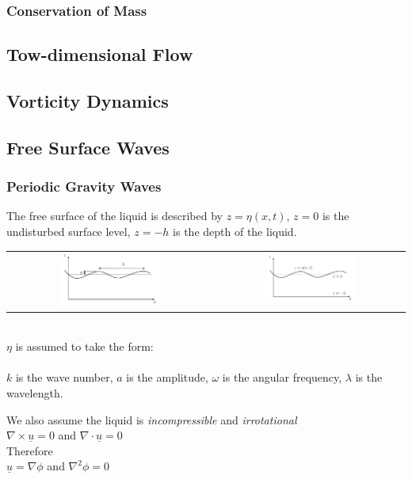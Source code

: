 \subsubsection{Conservation of Mass}
\subsection{Tow-dimensional Flow}
\subsection{Vorticity Dynamics}
\subsection{Free Surface Waves}
\subsubsection{Periodic Gravity Waves}
\begin{center}
	The free surface of the liquid is described by $z = \eta (x,t)$, $z=0$ is the undisturbed surface level, $z=-h$ is the depth of the liquid.
	\\
	\begin{tabular}{cc}
		\includegraphics[width=0.5\textwidth]{"Images/Gravity Waves2.png"} & \includegraphics[width=0.5\textwidth]{"Images/Gravity Waves.png"}
	\end{tabular}
	\\
	$\eta$ is assumed to take the form:
	\\
	\\
	$k$ is the wave number, $a$ is the amplitude, $\omega$ is the angular frequency, $\lambda$ is the wavelength.
	\\
\end{center}
\begin{center}
	We also assume the liquid is \textit{incompressible} and \textit{irrotational}
	\\
	$\nabla \times \underline{u} = 0$ and $\nabla \cdot \underline{u} = 0$
	\\
	Therefore
	\\
	$\underline{u} = \nabla \phi$ and $\nabla^2 \phi = 0$
\end{center}
